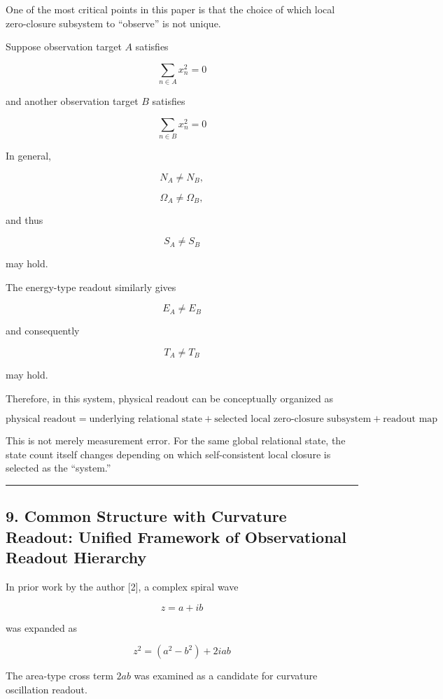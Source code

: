 \documentclass[
  a4paper,
]{article}
\begin{document}
One of the most critical points in this paper is that the choice of
which local zero-closure subsystem to ``observe'' is not unique.

Suppose observation target \(A\) satisfies

\[
\sum_{n\in A}x_n^2=0
\]

and another observation target \(B\) satisfies

\[
\sum_{n\in B}x_n^2=0
\]

In general,

\[
N_A\neq N_B,
\]

\[
\Omega_A\neq\Omega_B,
\]

and thus

\[
S_A\neq S_B
\]

may hold.

The energy-type readout similarly gives

\[
E_A\neq E_B
\]

and consequently

\[
T_A\neq T_B
\]

may hold.

Therefore, in this system, physical readout can be conceptually
organized as

\[
\boxed{
\text{physical readout}
=
\text{underlying relational state}
+
\text{selected local zero-closure subsystem}
+
\text{readout map}
}
\tag{18}
\]

This is not merely measurement error. For the same global relational
state, the state count itself changes depending on which self-consistent
local closure is selected as the ``system.''

\begin{center}\rule{0.5\linewidth}{0.5pt}\end{center}

\subsection{9. Common Structure with Curvature Readout: Unified
Framework of Observational Readout
Hierarchy}\label{common-structure-with-curvature-readout-unified-framework-of-observational-readout-hierarchy}

In prior work by the author {[}2{]}, a complex spiral wave

\[
z=a+ib
\]

was expanded as

\[
z^2
=
(a^2-b^2)+2iab
\]

The area-type cross term \(2ab\) was examined as a candidate for
curvature oscillation readout.
\end{document}
